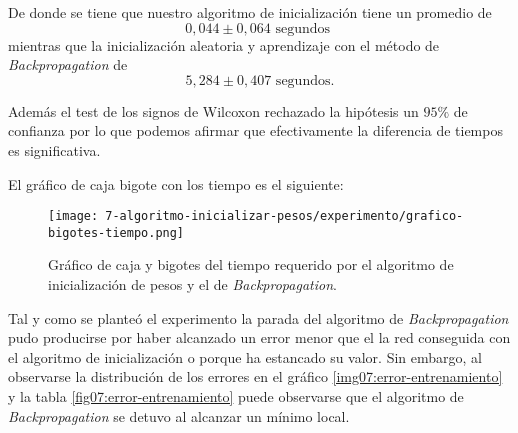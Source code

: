 De donde se tiene que nuestro algoritmo de inicialización tiene un promedio de 
\begin{equation}
    0,044 \pm 0,064 \text{ segundos }
\end{equation}
mientras que la inicialización aleatoria y aprendizaje con el método de 
\textit{Backpropagation} de 
\begin{equation}
    5,284 \pm 0,407   \text{ segundos}.
\end{equation}

Además el test de los signos de Wilcoxon rechazado la hipótesis un $95\%$ de confianza
por lo que podemos afirmar que efectivamente la diferencia de tiempos es significativa. 

El gráfico de caja bigote con los tiempo es el siguiente: 

\begin{figure}[H]
    \centering
     \texttt{[image: 7-algoritmo-inicializar-pesos/experimento/grafico-bigotes-tiempo.png]}
     \caption{Gráfico de caja y bigotes del tiempo requerido por el algoritmo de inicialización de pesos y el de \textit{Backpropagation}.}
\end{figure}
\begin{table}[H]
    \centering
    \label{fig07:error-entrenamiento}
    \caption{Error mínimo cuadrático obtenido en entrenamiento tras acabar la ejecución}
\end{table}

Tal y como se planteó el experimento la parada del algoritmo de \textit{Backpropagation} 
pudo producirse por haber alcanzado un error menor que el la red conseguida con el 
algoritmo de inicialización o porque ha estancado su valor.
Sin embargo, al observarse la distribución de los errores en el 
gráfico \ref{img07:error-entrenamiento} y la tabla \ref{fig07:error-entrenamiento} puede observarse que 
el algoritmo de \textit{Backpropagation} se detuvo al alcanzar un 
mínimo local. 

